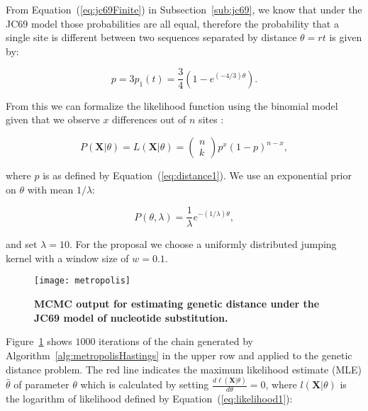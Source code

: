 From Equation~(\ref{eq:jc69Finite}) in Subsection~\ref{sub:jc69}, we know that under the JC69 model those probabilities are all equal, therefore the probability that a single site is different between two sequences separated by distance $\theta=rt$ is given by:

\begin{equation}
p=3p_{1}\left(t\right)=\frac{3}{4}\left(1-e^{\left(-4/3\right)\theta}\right).
\label{eq:distance1}
\end{equation}

\noindent
From this we can formalize the likelihood function using the binomial model given that we observe $x$ differences out of $n$ sites :

\begin{equation}
P\left(\mathbf{X}|\theta\right)=L\left(\mathbf{X}|\theta\right)=\left(\begin{array}{c}
n\\
k
\end{array}\right)p^{x}(1-p)^{n-x},
\label{eq:likelihood1}
\end{equation}

\noindent
where $p$ is as defined by Equation~(\ref{eq:distance1}).
We use an exponential prior on $\theta$ with mean $1/\lambda$:

\begin{equation}
P\left(\theta,\lambda\right)=\frac{1}{\lambda}e^{-(1/\lambda)\theta},
\label{eq:expPrior}
\end{equation}

\noindent
and set $\lambda=10$.
For the proposal we choose a uniformly distributed jumping kernel with a window size of $w=0.1$.

\begin{figure}[H]
\centering
\texttt{[image: metropolis]} 
\caption{
{ \footnotesize 
{\bf MCMC output for estimating genetic distance under the JC69 model of nucleotide substitution.
} 
}%
}
\label{fig:metropolis}
\end{figure}

Figure~\ref{fig:metropolis} shows $1000$ iterations of the chain generated by Algorithm~\ref{alg:metropolisHastings} in the upper row and applied to the genetic distance problem.
The red line 
indicates the maximum likelihood estimate (MLE) $\hat{\theta}$ of parameter $\theta$ which is calculated by setting $\frac{d\ell\left(\mathbf{X}|\theta\right)}{d\theta}=0$, where $l\left(\mathbf{X}|\theta\right)$ is the logarithm of likelihood defined by Equation~(\ref{eq:likelihood1}):

